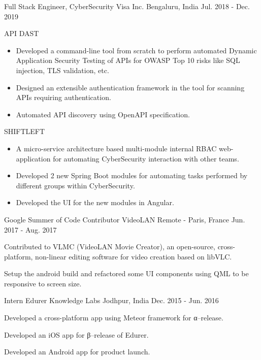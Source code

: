 \begin{cventries}
  \cventry
    {Full Stack Engineer, CyberSecurity} %
    {Visa Inc.} %
    {Bengaluru, India} %
    {Jul. 2018 - Dec. 2019} %
    {
      \begin{cvitems} %
        \item {API DAST}
	  \begin{itemize}
	    \item {Developed a command-line tool from scratch to perform automated Dynamic Application Security Testing of APIs for OWASP Top 10 risks like SQL injection, TLS validation, etc.}
	    \item {Designed an extensible authentication framework in the tool for scanning APIs requiring authentication.}
	    \item {Automated API discovery using OpenAPI specification.}
	  \end{itemize}
        \item {SHIFTLEFT}
	  \begin{itemize}
	    \item {A micro-service architecture based multi-module internal RBAC web-application for automating CyberSecurity interaction with other teams.}
	    \item {Developed 2 new Spring Boot modules for automating tasks performed by different groups within CyberSecurity.}
	    \item {Developed the UI for the new modules in Angular.}
	  \end{itemize}
      \end{cvitems}
    }

  \cventry
    {Google Summer of Code Contributor} %
    {VideoLAN} %
    {Remote - Paris, France} %
    {Jun. 2017 - Aug. 2017} %
    {
      \begin{cvitems} %
        \item {Contributed to VLMC (VideoLAN Movie Creator), an open-source, cross-platform, non-linear editing software for video creation based on libVLC.}
	\item {Setup the android build and refactored some UI components using QML to be responsive to screen size.}
      \end{cvitems}
    }

  \cventry
    {Intern} %
    {Edurer Knowledge Labs} %
    {Jodhpur, India} %
    {Dec. 2015 - Jun. 2016} %
    {
      \begin{cvitems} %
        \item {Developed a cross-platform app using Meteor framework for α–release.}
	\item {Developed an iOS app for β–release of Edurer.}
	\item {Developed an Android app for product launch.}
      \end{cvitems}
    }

\end{cventries}
